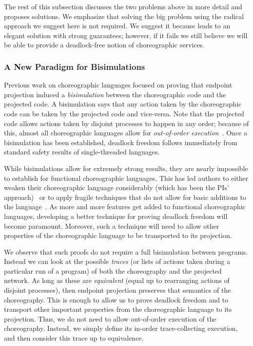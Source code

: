 The rest of this subsection discusses the two problems above in more detail and proposes solutions.
We emphasize that solving the big problem using the radical approach we suggest here is not required.
We suggest it because leads to an elegant solution with strong guarantees; however, if it fails we still believe we will be able to provide a deadlock-free notion of choreographic services.

\subsubsection{A New Paradigm for Bisimulations}
\label{sec:new-parad-bisim}

Previous work on choreographic languages focused on proving that endpoint projection induced a \emph{bisimulation} between the choreographic code and the projected code.
A bisimulation says that any action taken by the choreographic code can be taken by the projected code and vice-versa.
Note that the projected code allows actions taken by disjoint processes to happen in any order; because of this, almost all choreographic languages allow for \emph{out-of-order execution}~\cite{Montesi23,HirschG22,Cruz-FilipeM17}.
Once a bisimulation has been established, deadlock freedom follows immediately from standard safety results of single-threaded languages.

While bisimulations allow for extremely strong results, they are nearly impossible to establish for functional choreographic languages.
This has led authors to either weaken their choreographic language considerably (which has been the PIs' approach)~\cite{HirschG22,SamuelsonHC25} or to apply fragile techniques that do not allow for basic additions to the language~\cite{CruzFilipeGLMP23}.
As more and more features get added to functional choreographic languages, developing a better technique for proving deadlock freedom will become paramount.
Moreover, such a technique will need to allow other properties of the choreographic language to be transported to its projection.

We observe that such proofs do not require a full bisimulation between programs.
Instead we can look at the possible \emph{traces} (or lists of actions taken during a particular run of a program) of both the choreography and the projected network.
As long as these are \emph{equivalent} (equal up to rearranging actions of disjoint processes), then endpoint projection preserves that semantics of the choreography.
This is enough to allow us to prove deadlock freedom and to transport other important properties from the choreographic language to its projection.
Thus, we do not need to allow out-of-order execution of the choreography.
Instead, we simply define its in-order trace-collecting execution, and then consider this trace up to equivalence.

